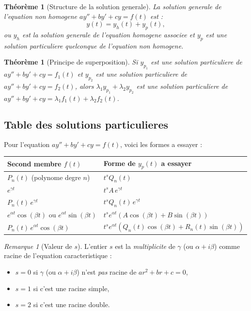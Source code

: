 \documentclass[12pt,a4paper,openany]{book}
\theoremstyle{definition}
\theoremstyle{plain}
\newtheorem{theoreme}[definition]{Théorème}
\theoremstyle{remark}
\newtheorem{remarque}[definition]{Remarque}
\begin{document}
\begin{theoreme}[Structure de la solution generale]\label{thm:structure-sol}
La solution generale de l'equation non homogene $ay'' + by' + cy = f(t)$ est :
\[
  y(t) = y_h(t) + y_p(t),
\]
ou $y_h$ est la solution generale de l'equation homogene associee et $y_p$ est une solution particuliere quelconque de l'equation non homogene.
\end{theoreme}

\begin{theoreme}[Principe de superposition]\label{thm:superposition}
Si $y_{p_1}$ est une solution particuliere de $ay'' + by' + cy = f_1(t)$ et $y_{p_2}$ est une solution particuliere de $ay'' + by' + cy = f_2(t)$, alors $\lambda_1 y_{p_1} + \lambda_2 y_{p_2}$ est une solution particuliere de $ay'' + by' + cy = \lambda_1 f_1(t) + \lambda_2 f_2(t)$.
\end{theoreme}

\subsection{Table des solutions particulieres}\label{subsec:table-sp}

Pour l'equation $ay'' + by' + cy = f(t)$, voici les formes a essayer :

\begin{center}
\renewcommand{\arraystretch}{1.6}
\begin{tabular}{@{}p{5.5cm}p{7.5cm}@{}}
\toprule
\textbf{Second membre $f(t)$} & \textbf{Forme de $y_p(t)$ a essayer} \\
\midrule
$P_n(t)$ (polynome degre $n$) & $t^s Q_n(t)$ \\
$e^{\gamma t}$ & $t^s A\, e^{\gamma t}$ \\
$P_n(t)\, e^{\gamma t}$ & $t^s Q_n(t)\, e^{\gamma t}$ \\
$e^{\alpha t}\cos(\beta t)$ ou $e^{\alpha t}\sin(\beta t)$ & $t^s e^{\alpha t}(A\cos(\beta t) + B\sin(\beta t))$ \\
$P_n(t)\, e^{\alpha t}\cos(\beta t)$ & $t^s e^{\alpha t}(Q_n(t)\cos(\beta t) + R_n(t)\sin(\beta t))$ \\
\bottomrule
\end{tabular}
\end{center}

\begin{remarque}[Valeur de $s$]\label{rem:valeur-s}
L'entier $s$ est la \emph{multiplicite} de $\gamma$ (ou $\alpha + i\beta$) comme racine de l'equation caracteristique :
\begin{itemize}
  \item $s = 0$ si $\gamma$ (ou $\alpha + i\beta$) n'est \emph{pas} racine de $ar^2 + br + c = 0$,
  \item $s = 1$ si c'est une racine simple,
  \item $s = 2$ si c'est une racine double.
\end{itemize}
\end{remarque}
\end{document}
